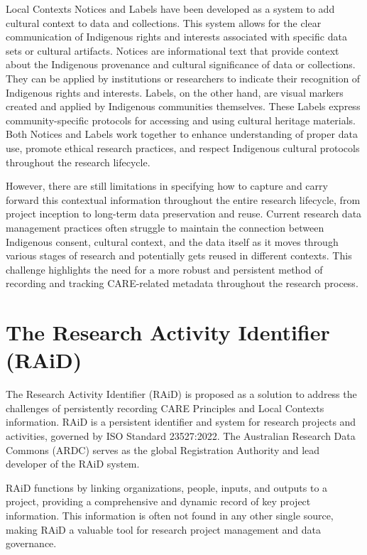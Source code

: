 \documentclass[a0,portrait]{a0poster}
\begin{document}
\begin{multicols}{2}
{Local Contexts Notices and Labels have been developed as a system to add cultural context to data and collections. This system allows for the clear communication of Indigenous rights and interests associated with specific data sets or cultural artifacts. Notices are informational text that provide context about the Indigenous provenance and cultural significance of data or collections. They can be applied by institutions or researchers to indicate their recognition of Indigenous rights and interests. Labels, on the other hand, are visual markers created and applied by Indigenous communities themselves. These Labels express community-specific protocols for accessing and using cultural heritage materials. Both Notices and Labels work together to enhance understanding of proper data use, promote ethical research practices, and respect Indigenous cultural protocols throughout the research lifecycle.

However, there are still limitations in specifying how to capture and carry forward this contextual information throughout the entire research lifecycle, from project inception to long-term data preservation and reuse. Current research data management practices often struggle to maintain the connection between Indigenous consent, cultural context, and the data itself as it moves through various stages of research and potentially gets reused in different contexts. This challenge highlights the need for a more robust and persistent method of recording and tracking CARE-related metadata throughout the research process.
}

\color{ARDCBlue}
\section*{\LARGE The Research Activity Identifier (RAiD)}
\color{DarkGrey}
\large{
The Research Activity Identifier (RAiD) is proposed as a solution to address the challenges of persistently recording CARE Principles and Local Contexts information. RAiD is a persistent identifier and system for research projects and activities, governed by ISO Standard 23527:2022. The Australian Research Data Commons (ARDC) serves as the global Registration Authority and lead developer of the RAiD system.

RAiD functions by linking organizations, people, inputs, and outputs to a project, providing a comprehensive and dynamic record of key project information. This information is often not found in any other single source, making RAiD a valuable tool for research project management and data governance.

}
\end{multicols}
\end{document}
